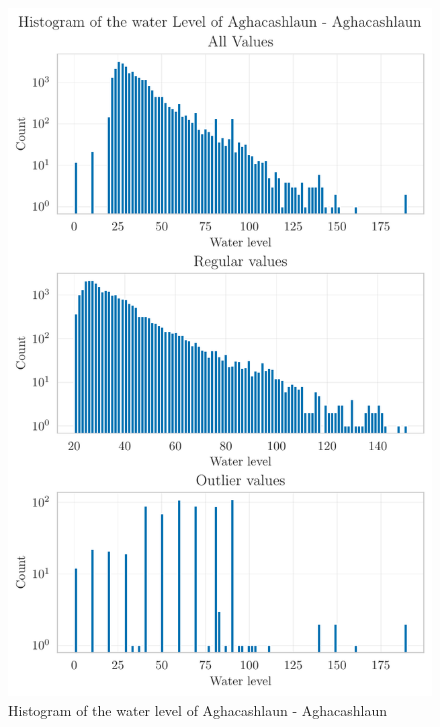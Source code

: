 \begin{figure}[htp]
    \centering 
    \includegraphics{./plots/pdfs/36022-ie/water_level_histogram_36022-ie.pdf}
    \caption{Histogram of the water level of Aghacashlaun - Aghacashlaun}
    \label{figure:water-level-histogram-36022-ie}
\end{figure}
